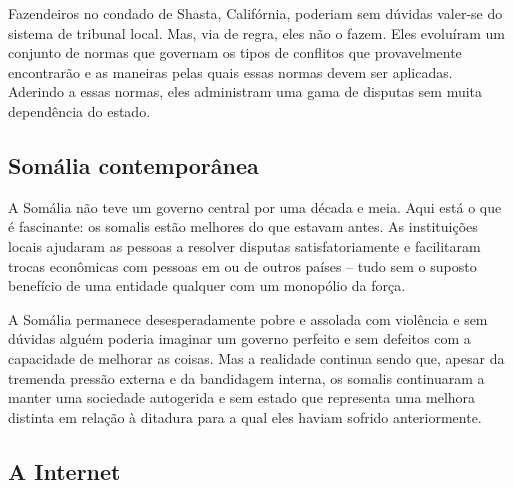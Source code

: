 Fazendeiros no condado de Shasta, Califórnia, poderiam sem dúvidas valer-se do sistema de tribunal local. Mas, via de regra, eles não o fazem. Eles evoluíram um conjunto de normas que governam os tipos de conflitos que provavelmente encontrarão e as maneiras pelas quais essas normas devem ser aplicadas. Aderindo a essas normas, eles administram uma gama de disputas sem muita dependência do estado.

\subsection*{Somália contemporânea}

A Somália não teve um governo central por uma década e meia. Aqui está o que é fascinante: os somalis estão melhores do que estavam antes. As instituições locais ajudaram as pessoas a resolver disputas satisfatoriamente e facilitaram trocas econômicas com pessoas em ou de outros países -- tudo sem o suposto benefício de uma entidade qualquer com um monopólio da força.

A Somália permanece desesperadamente pobre e assolada com violência e sem dúvidas alguém poderia imaginar um governo perfeito e sem defeitos com a capacidade de melhorar as coisas. Mas a realidade continua sendo que, apesar da tremenda pressão externa e da bandidagem interna, os somalis continuaram a manter uma sociedade autogerida e sem estado que representa uma melhora distinta em relação à ditadura para a qual eles haviam sofrido anteriormente.

\subsection*{A Internet}


